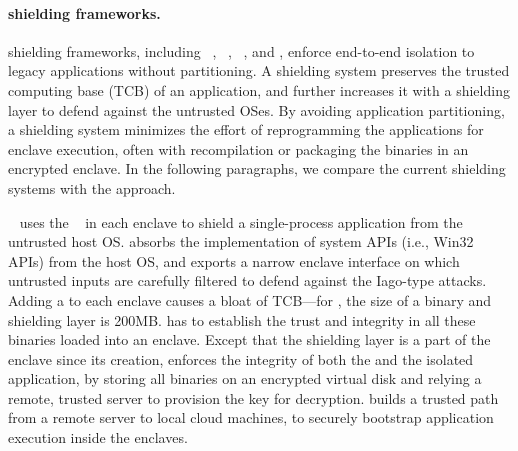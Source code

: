 \paragraph{\sgx{} shielding frameworks.}
\sgx{} shielding frameworks, including \haven{}~\cite{baumann14haven}, \scone{}~\cite{osdi16scone}, \panoply{}~\cite{shinde17panoply}, and \graphenesgx{}, enforce end-to-end isolation to
legacy applications without partitioning.
A \sgx{} shielding system preserves the trusted computing base (TCB)
of an application, and further increases it with a shielding layer to defend against the untrusted OSes.
By avoiding application partitioning,
a shielding system minimizes the effort of reprogramming the applications for enclave execution, often with recompilation or packaging the binaries in an encrypted enclave.
In the following paragraphs, we compare the current shielding systems with the \graphenesgx{} approach.

\haven{}~\cite{baumann14haven} uses the \drawbridge{} \libos{}~\cite{porter11drawbridge} in each enclave
to shield a single-process \emph{\win{}} application from the untrusted host OS.
\haven{} absorbs the implementation of system APIs (i.e., Win32 APIs) from the host OS,
and exports a narrow enclave interface on which untrusted inputs are carefully filtered to defend against the Iago-type attacks.
Adding a \libos{} to each enclave causes a bloat of TCB---for \haven{}, the size of a \libos{} binary and shielding layer is \roughly{}200MB.
\haven{} has to establish the trust and integrity in all these binaries loaded into an enclave. Except that the shielding layer is a part of the enclave since its creation, \haven{} enforces the integrity of both the \libos{} and the isolated application,
by storing all binaries on an encrypted virtual disk and relying a remote, trusted server to provision the key for decryption.
\haven{} builds a trusted path from a remote server to local cloud machines,
to securely bootstrap application execution inside the enclaves.




